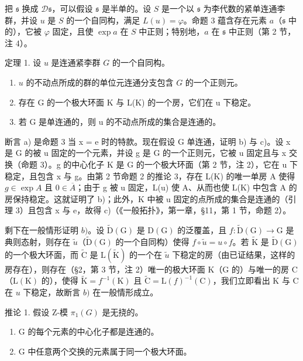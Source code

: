 把 \(\mathfrak{s}\) 换成 \(\mathcal{D}\mathfrak{s}\)，可以假设 \(\mathfrak{s}\) 是半单的。设 \(S\) 是一个以 \(\mathfrak{s}\) 为李代数的紧单连通李群，并设 \(u\) 是 \(S\) 的一个自同构，满足 \(L(u) = \varphi\)。命题 3 蕴含存在元素 \(a\)（\(\mathfrak{s}\) 中的），它被 \(\varphi\) 固定，且使 \(\exp a\) 在 \(S\) 中正则；特别地，\(a\) 在 \(\mathfrak{s}\) 中正则（第 2 节，注 4）。

定理 1. 设 \(u\) 是连通紧李群 \(G\) 的一个自同构。

\begin{enumerate}
\def\labelenumi{\alph{enumi})}
\item
  \(u\) 的不动点所成的群的单位元连通分支包含 \(G\) 的一个正则元。
\item
  存在 G 的一个极大环面 K 与 L(K) 的一个房，它们在 u 下稳定。
\item
  若 G 是单连通的，则 u 的不动点所成的集合是连通的。
\end{enumerate}

断言 a) 是命题 3 当 x = e 时的特款。现在假设 G 单连通，证明 b) 与 c)。设 x 是 G 的被 u 固定的一个元素，并设 g 是 G 的一个正则元，它被 u 固定且与 x 交换（命题 3）。g 的中心化子 K 是 G 的一个极大环面（第 2 节，注 2），它在 u 下稳定，且包含 x 与 g。由第 2 节命题 2 的推论 3，存在 L(K) 的唯一单房 A 使得 \(g \in \exp A\) 且 \(0 \in \overline{A}\)；由于 g 被 u 固定，L(u) 使 A、从而也使 L(K) 中包含 A 的房保持稳定。这就证明了 b)；此外，K 中被 u 固定的点所成的集合是连通的（引理 3）且包含 x 与 e，故得 c)（《一般拓扑》，第一章，§11，第 1 节，命题 2）。

剩下在一般情形证明 \(b)\)。设 \(\tilde{\mathrm{D}}(\mathrm{G})\) 是 \(\mathrm{D}(\mathrm{G})\) 的泛覆盖，且 \(f: \tilde{\mathrm{D}}(\mathrm{G}) \to \mathrm{G}\) 是典则态射，则存在 \(\tilde{u}\)（\(\tilde{\mathrm{D}}(\mathrm{G})\) 的一个自同构）使得 \(f \circ \tilde{u} = u \circ f\)。若 \(\tilde{\mathrm{K}}\) 是 \(\tilde{\mathrm{D}}(\mathrm{G})\) 的一个极大环面，而 \(\tilde{\mathrm{C}}\) 是 \(\mathrm{L}(\tilde{\mathrm{K}})\) 的一个在 \(\tilde{u}\) 下稳定的房（由已证结果，这样的房存在），则存在（§2，第 3 节，注 2）唯一的极大环面 \(\mathrm{K}\)（\(\mathrm{G}\) 的）与唯一的房 \(\mathrm{C}\)（\(\mathrm{L}(\mathrm{K})\) 的），使得 \(\tilde{\mathrm{K}} = f^{-1}(\mathrm{K})\) 且 \(\tilde{\mathrm{C}} = \mathrm{L}(f)^{-1}(\mathrm{C})\)，我们立即看出 \(\mathrm{K}\) 与 \(\mathrm{C}\) 在 \(u\) 下稳定，故断言 \(b)\) 在一般情形成立。

推论 1. 假设 Z-模 \(\pi_{1}(G)\) 是无挠的。

\begin{enumerate}
\def\labelenumi{\alph{enumi})}
\item
  G 的每个元素的中心化子都是连通的。
\item
  G 中任意两个交换的元素属于同一个极大环面。
\end{enumerate}

